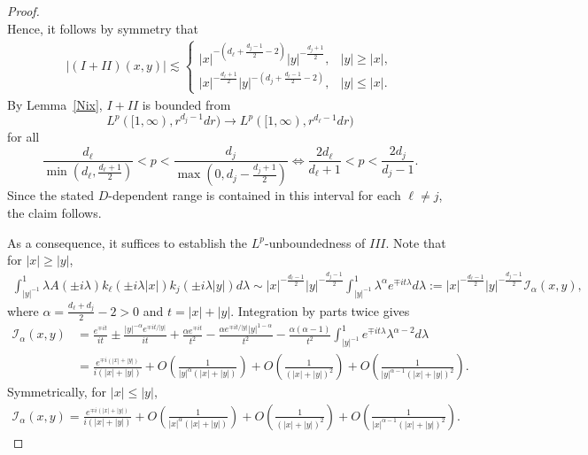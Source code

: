 \documentclass[10pt,a4paper]{amsart}
\begin{document}
\begin{proof}
\begin{equation*}
\end{equation*}
Hence, it follows by symmetry that
\begin{align*}
    |(I+II)(x,y)|\lesssim \begin{cases}
        |x|^{-\left( d_\ell+\frac{d_j-1}{2}-2 \right)} |y|^{-\frac{d_j+1}{2}}, & |y|\ge |x|,\\
        |x|^{-\frac{d_\ell+1}{2}} |y|^{-\left( d_j + \frac{d_\ell-1}{2} -2 \right)}, & |y|\le |x|.
    \end{cases}
\end{align*}
By Lemma~\ref{Nix}, $I+II$ is bounded from 
\begin{equation*}
    L^p([1,\infty),r^{d_j-1}dr) \to L^p([1,\infty),r^{d_\ell-1}dr)
\end{equation*}
for all
\begin{equation}
    \frac{d_\ell}{\min \left( d_\ell, \frac{d_\ell+1}{2} \right)} < p < \frac{d_j}{\max\left( 0, d_j - \frac{d_j+1}{2} \right)} \iff \frac{2d_\ell}{d_\ell+1} < p < \frac{2d_j}{d_j-1}.
\end{equation}
Since the stated $D$-dependent range is contained in this interval for each $\ell\neq j$, the claim follows.

As a consequence, it suffices to establish the $L^p$-unboundedness of $III$. Note that for $|x|\ge |y|$,
\begin{align*}
    \int_{|y|^{-1}}^1  \lambda A(\pm i\lambda) k_\ell(\pm i\lambda|x|) k_j(\pm i\lambda|y|) d\lambda \sim |x|^{-\frac{d_\ell-1}{2}} |y|^{-\frac{d_j-1}{2}}\int_{|y|^{-1}}^1 \lambda^{\alpha} e^{\mp i t\lambda} d\lambda := |x|^{-\frac{d_\ell-1}{2}} |y|^{-\frac{d_j-1}{2}} \mathcal{I}_\alpha(x,y),
\end{align*}
where $\alpha = \frac{d_\ell+d_j}{2}-2>0$ and $t = |x|+|y|$. Integration by parts twice gives
\begin{align}\nonumber
    \mathcal{I}_\alpha(x,y) &= \frac{e^{\mp it}}{it} \pm \frac{|y|^{-\alpha} e^{\mp it/|y|}}{it} + \frac{\alpha e^{\mp it}}{t^2} - \frac{\alpha e^{\mp it/|y|} |y|^{1-\alpha}}{t^2}    - \frac{\alpha (\alpha-1)}{t^2} \int_{|y|^{-1}}^1 e^{\mp it \lambda}  \lambda^{\alpha-2} d\lambda \\ \label{I1}
    &= \frac{e^{\mp i(|x|+|y|)}}{i(|x|+|y|)} + O\left(\frac{1}{|y|^{\alpha}(|x|+|y|)}\right) + O\left(\frac{1}{(|x|+|y|)^2}\right) + O\left(\frac{1}{|y|^{\alpha-1}(|x|+|y|)^2}\right).
\end{align}
Symmetrically, for $|x|\le |y|$,
\begin{align}\label{I2}
    \mathcal{I}_\alpha(x,y)= \frac{e^{\mp i(|x|+|y|)}}{i(|x|+|y|)} + O\left(\frac{1}{|x|^{\alpha}(|x|+|y|)}\right) + O\left(\frac{1}{(|x|+|y|)^2}\right) + O\left(\frac{1}{|x|^{\alpha-1}(|x|+|y|)^2}\right).
\end{align}


\end{proof}
\end{document}
